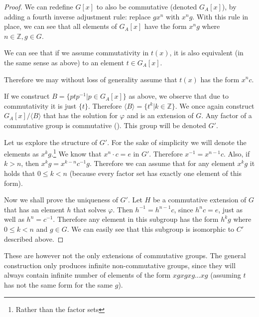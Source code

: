 \begin{proof}
	We can redefine $G[x]$ to also be commutative (denoted $G_A[x]$), by adding a fourth inverse adjustment rule: replace $gx^n$ with $x^ng$. With this rule in place, we can see that all elements of $G_A[x]$ have the form $x^ng$ where $n\in\mathbb{Z},g\in G$.
	
	We can see that if we assume commutativity in $t(x)$, it is also equivalent (in the same sense as above) to an element $t\in G_A[x]$. 
	
	Therefore we may without loss of generality assume that $t(x)$ has the form $x^nc$. 
	
	If we construct $B=\{ptp^{-1}|p\in G_A[x]\}$ as above, we observe that due to commutativity it is just $\{t\}$. Therefore $\langle B\rangle=\{t^k|k\in \mathbb{Z}\}$. We once again construct $G_A[x]/\langle B\rangle$ that has the solution for $\varphi$ and is an extension of $G$. Any factor of a commutative group is commutative (\cite{group}). This group will be denoted $G'$.
	
	Let us explore the structure of $G'$. For the sake of simplicity we will denote the elements as $x^kg$.\footnote{Rather than the factor sets} We know that $x^n\cdot c=e$ in $G'$. Therefore $x^{-1}=x^{n-1}c$. Also, if $k>n$, then $x^kg=x^{k-n}c^{-1}g$. Therefore we can assume that for any element $x^kg$ it holds that $0\leq k<n$ (because every factor set has exactly one element of this form). 
	
	Now we shall prove the uniqueness of $G'$. Let $H$ be a commutative extension of $G$ that has an element $h$ that solves $\varphi$. Then $h^{-1}=h^{n-1}c$, since $h^nc=e$, just as well as $h^n=c^{-1}$. Therefore any element in this subgroup has the form $h^kg$ where $0\leq k<n$ and $g\in G$. We can easily see that this subgroup is isomorphic to $C'$ described above.
\end{proof}

These are however not the only extensions of commutative groups. The general construction only produces infinite non-commutative groups, since they will always contain infinite number of elements of the form $xgxgxg...xg$ (assuming $t$ has not the same form for the same $g$). 


